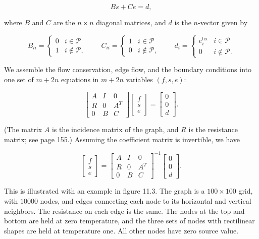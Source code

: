 \[Bs+Ce=d,\]

where \(B\) and \(C\) are the \(n\times n\) diagonal matrices, and \(d\) is the \(n\)-vector given by

\[B_{ii}=\left\{\begin{array}{ll}0&i\in\mathcal{P}\\ 1&i\not\in\mathcal{P},\end{array}\right.\qquad C_{ii}=\left\{\begin{array}{ ll}1&i\in\mathcal{P}\\ 0&i\not\in\mathcal{P},\end{array}\right.\qquad d_{i}=\left\{\begin{array}{ ll}e_{i}^{\mathrm{fix}}&i\in\mathcal{P}\\ 0&i\not\in\mathcal{P}.\end{array}\right.\]

We assemble the flow conservation, edge flow, and the boundary conditions into one set of \(m+2n\) equations in \(m+2n\) variables \((f,s,e)\):

\[\left[\begin{array}{ccc}A&I&0\\ R&0&A^{T}\\ 0&B&C\end{array}\right]\left[\begin{array}{c}f\\ s\\ e\end{array}\right]=\left[\begin{array}{c}0\\ 0\\ d\end{array}\right].\]

(The matrix \(A\) is the incidence matrix of the graph, and \(R\) is the resistance matrix; see page 155.) Assuming the coefficient matrix is invertible, we have

\[\left[\begin{array}{c}f\\ s\\ e\end{array}\right]=\left[\begin{array}{ccc}A&I&0\\ R&0&A^{T}\\ 0&B&C\end{array}\right]^{-1}\left[\begin{array}{c}0\\ 0\\ d\end{array}\right].\]

This is illustrated with an example in figure 11.3. The graph is a \(100\times 100\) grid, with \(10000\) nodes, and edges connecting each node to its horizontal and vertical neighbors. The resistance on each edge is the same. The nodes at the top and bottom are held at zero temperature, and the three sets of nodes with rectilinear shapes are held at temperature one. All other nodes have zero source value.

 
